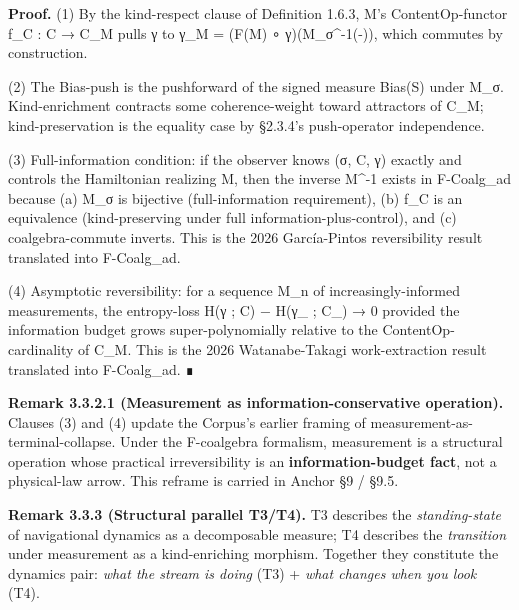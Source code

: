 \documentclass[11pt, openany]{book}
\begin{document}
\textbf{Proof.}
(1) By the kind-respect clause of Definition 1.6.3, M's ContentOp-functor f\_\allowbreak{}C : C → C\_\allowbreak{}M pulls γ to γ\_\allowbreak{}M = (F(M) ∘ γ)(M\_\allowbreak{}σ\textasciicircum{}{-1}(-)), which commutes by construction.

(2) The Bias-push is the pushforward of the signed measure Bias(S) under M\_\allowbreak{}σ. Kind-enrichment contracts some coherence-weight toward attractors of C\_\allowbreak{}M; kind-preservation is the equality case by §2.3.4's push-operator independence.

(3) Full-information condition: if the observer knows (σ, C, γ) exactly and controls the Hamiltonian realizing M, then the inverse M\textasciicircum{}{-1} exists in F-Coalg\_\allowbreak{}ad because (a) M\_\allowbreak{}σ is bijective (full-information requirement), (b) f\_\allowbreak{}C is an equivalence (kind-preserving under full information-plus-control), and (c) coalgebra-commute inverts. This is the 2026 García-Pintos reversibility result translated into F-Coalg\_\allowbreak{}ad.

(4) Asymptotic reversibility: for a sequence M\_\allowbreak{}n of increasingly-informed measurements, the entropy-loss H(γ ; C) − H(γ\_ ; C\_) → 0 provided the information budget grows super-polynomially relative to the ContentOp-cardinality of C\_\allowbreak{}M. This is the 2026 Watanabe-Takagi work-extraction result translated into F-Coalg\_\allowbreak{}ad. ∎

\textbf{Remark 3.3.2.1 (Measurement as information-conservative operation).} Clauses (3) and (4) update the Corpus's earlier framing of measurement-as-terminal-collapse. Under the F-coalgebra formalism, measurement is a structural operation whose practical irreversibility is an \textbf{information-budget fact}, not a physical-law arrow. This reframe is carried in Anchor §9 / §9.5.

\textbf{Remark 3.3.3 (Structural parallel T3/T4).} T3 describes the \textit{standing-state} of navigational dynamics as a decomposable measure; T4 describes the \textit{transition} under measurement as a kind-enriching morphism. Together they constitute the dynamics pair: \textit{what the stream is doing} (T3) + \textit{what changes when you look} (T4).
\end{document}
